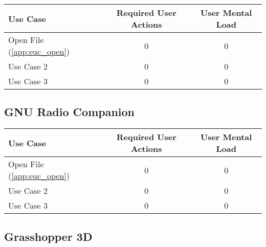 \begin{tabularx}{\textwidth}{Xcc}
\textbf{Use Case} & \textbf{Required User Actions} & \textbf{User Mental Load}\\
\hline
Open File (\ref{app:euc_open}) & {\color{red}0} & {\color{red}0} \\
Use Case 2                     & {\color{red}0} & {\color{red}0} \\
Use Case 3                     & {\color{red}0} & {\color{red}0}
\end{tabularx}

\subsection*{GNU Radio Companion}

\begin{tabularx}{\textwidth}{Xcc}
\textbf{Use Case} & \textbf{Required User Actions} & \textbf{User Mental Load}\\
\hline
Open File (\ref{app:euc_open}) & {\color{red}0} & {\color{red}0} \\
Use Case 2                     & {\color{red}0} & {\color{red}0} \\
Use Case 3                     & {\color{red}0} & {\color{red}0}
\end{tabularx}

\subsection*{Grasshopper 3D}




